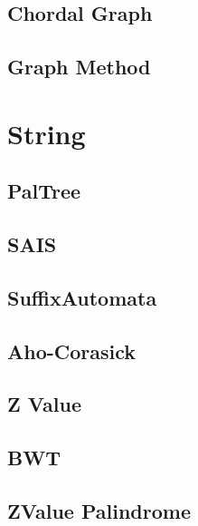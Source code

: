 \documentclass[a4paper,10pt,twocolumn,oneside]{article}
\begin{document}
\subsection{Chordal Graph}


\subsection{Graph Method}


\section{String}
\subsection{PalTree}


%

\subsection{SAIS}


\subsection{SuffixAutomata}


\subsection{Aho-Corasick}


\subsection{Z Value}


\subsection{BWT}


\subsection{ZValue Palindrome}

\end{document}

